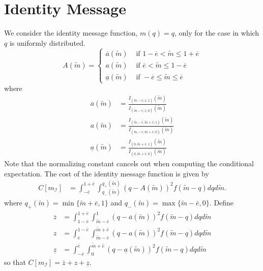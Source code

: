 \documentclass{article}
\begin{document}
\section{Identity Message}
We consider the identity message function, $m(q)=q$, only for the case in which $q$ is uniformly distributed. 
\begin{equation}
	A(\widetilde{m})=
	\begin{cases}
		\overline{a}(\widetilde{m}) & \text{ if } 1-\overline{e}<\widetilde{m}\leq 1+\overline{e}\\
		a(\widetilde{m}) & \text{ if } \overline{e}<\widetilde{m}\leq 1-\overline{e}\\
		\underline{a}(\widetilde{m}) & \text{ if } -\overline{e}\leq\widetilde{m}\leq \overline{e}
	\end{cases}
\end{equation}
where
\begin{align}
	\overline{a}(\widetilde{m})&=\frac{I_{(\widetilde{m}-\bar{e},1,1)}(\widetilde{m})}{I_{(\widetilde{m}-\bar{e},1,0)}(\widetilde{m})}\\
	a(\widetilde{m})&=\frac{I_{(\widetilde{m}-\bar{e},\widetilde{m}+\bar{e},1)}(\widetilde{m})}{I_{(\widetilde{m}-\bar{e},\widetilde{m}+\bar{e},0)}(\widetilde{m})}\\
	\underline{a}(\widetilde{m})&=\frac{I_{(0,\widetilde{m}+\bar{e},1)}(\widetilde{m})}{I_{(0,\widetilde{m}+\bar{e},0)}(\widetilde{m})}
\end{align}
Note that the normalizing constant cancels out when computing the conditional expectation. The cost of the identity message function is given by
\begin{align}
	C[m_{\mathcal{I}}]&=\int_{-\bar{e}}^{1+\bar{e}}{\int_{q_{-}(\widetilde{m})}^{q_{+}(\widetilde{m})}{(q-A(\widetilde{m}))^{2}f(\widetilde{m}-q)dq}d\widetilde{m}}.
\end{align}
where $q_{+}(\widetilde{m})=\min\{\widetilde{m}+\bar{e},1\}$ and $q_{-}(\widetilde{m})=\max\{\widetilde{m}-\bar{e},0\}$. Define
\begin{align}
	\overline{z}&=\int_{1-\bar{e}}^{1+\bar{e}}{\int_{\widetilde{m}-\bar{e}}^{1}{(q-\overline{a}(\widetilde{m}))^{2}f(\widetilde{m}-q)dq}d\widetilde{m}}\\
	z&=\int_{\bar{e}}^{1-\bar{e}}{\int_{\widetilde{m}-\bar{e}}^{\widetilde{m}+\bar{e}}{(q-a(\widetilde{m}))^{2}f(\widetilde{m}-q)dq}d\widetilde{m}}\\
	\underline{z}&=\int_{-\bar{e}}^{\bar{e}}{\int_{0}^{\widetilde{m}+\bar{e}}{(q-\underline{a}(\widetilde{m}))^{2}f(\widetilde{m}-q)dq}d\widetilde{m}}
\end{align}
so that $C[m_{\mathcal{I}}]=\overline{z}+z+\underline{z}$.
\end{document}

